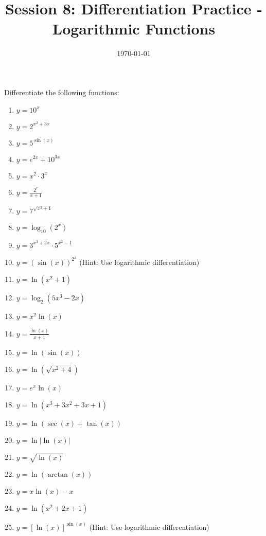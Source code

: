 \documentclass{article}
\begin{document}
\title{Session 8: Differentiation Practice - Logarithmic Functions}
\date{\today}
\maketitle

Differentiate the following functions:

\begin{enumerate}
\item $y = 10^x$
\item $y = 2^{x^2 + 3x}$
\item $y = 5^{\sin(x)}$
\item $y = e^{2x} + 10^{3x}$
\item $y = x^2 \cdot 3^x$
\item $y = \frac{2^x}{x + 1}$
\item $y = 7^{\sqrt{x^2 + 1}}$
\item $y = \log_{10}(2^x)$
\item $y = 3^{x^3 + 2x} \cdot 5^{x^2 - 1}$
\item $y = (\sin(x))^{2^x}$ (Hint: Use logarithmic differentiation)
\item $y = \ln(x^2 + 1)$
\item $y = \log_2(5x^3 - 2x)$
\item $y = x^2 \ln(x)$
\item $y = \frac{\ln(x)}{x + 1}$
\item $y = \ln(\sin(x))$
\item $y = \ln(\sqrt{x^2 + 4})$
\item $y = e^x \ln(x)$
\item $y = \ln(x^3 + 3x^2 + 3x + 1)$ 
\item $y = \ln(\sec(x) + \tan(x))$
\item $y = \ln|\ln(x)|$
\item $y = \sqrt{\ln(x)}$
\item $y = \ln(\arctan(x))$
\item $y = x \ln(x) - x$
\item $y = \ln(x^2 + 2x + 1)$
\item $y = [\ln(x)]^{\sin(x)}$ (Hint: Use logarithmic differentiation)
\end{enumerate}
\end{document}
